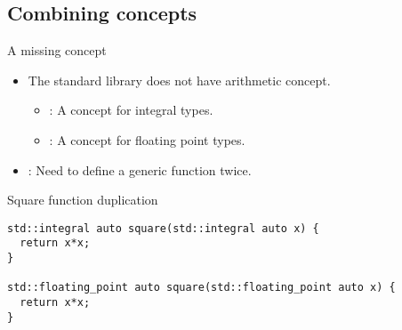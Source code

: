 \subsection{Combining concepts}

\begin{frame}[t,fragile]{A missing concept}
\begin{itemize}
  \item The standard library does not have arithmetic concept.
    \begin{itemize}
      \item {}: A concept for integral types.
      \item {}: A concept for floating point types.
    \end{itemize}

  \item {}: Need to define a generic function twice.
\end{itemize}


\begin{block}{Square function duplication}
\begin{lstlisting}
std::integral auto square(std::integral auto x) {
  return x*x;
}

std::floating_point auto square(std::floating_point auto x) {
  return x*x;
}
\end{lstlisting}
\end{block}
\end{frame}

